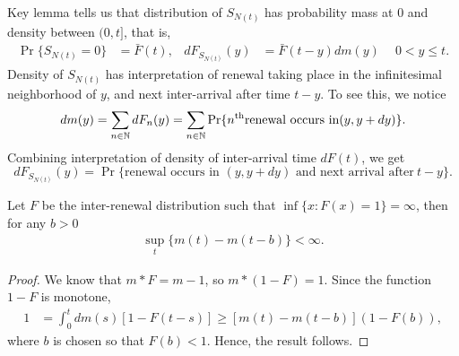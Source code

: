 \documentclass[a4paper,10pt,english]{article}
\begin{document}
\begin{shaded*}
Key lemma tells us that distribution of $S_{N(t)}$ has probability mass at $0$ and density between $(0,t]$, that is,
\begin{align*}
\Pr\{S_{N(t)}=0\}&=\bar{F}(t),& dF_{S_{N(t)}}(y)&=\bar{F}(t-y)dm(y)~\quad 0 < y \leq t.
\end{align*}
Density of $S_{N(t)}$ has interpretation of renewal taking place in the infinitesimal neighborhood of $y$, and next inter-arrival after time $t-y$. To see this, we notice 
\begin{equation*}
dm(y)=\sum_{n \in \mathbb{N}}dF_n(y) =\sum_{n \in \mathbb{N}}\Pr\{n^{\text{th}} \text{renewal occurs in} (y,y+dy)\}.
\end{equation*}
Combining interpretation of density of inter-arrival time $dF(t)$, we get
\begin{equation*}
dF_{S_{N(t)}}(y)=\Pr\{\text{renewal occurs in }(y,y+dy) \text{ and next arrival after}~ t-y\}.
\end{equation*}
\end{shaded*}

\begin{lem} 
Let $F$ be the inter-renewal distribution such that $\inf\{x: F(x) = 1\} = \infty$, then for any $b > 0$ 
\begin{align*}
\sup_{t} \{m(t)-m(t-b) \}< \infty.
\end{align*} 
\end{lem}
\begin{proof}
We know that $m \ast F = m - 1$, so $m \ast (1- F) = 1$. 
Since the function $1-F$ is monotone, 
\begin{align*}
1 &= \int_0^tdm(s)[1-F(t-s)] \geq [m(t) - m(t-b)](1-F(b)),
\end{align*}
where $b$ is chosen so that $F(b) < 1$. Hence, the result follows. 
\end{proof}
\end{document}
